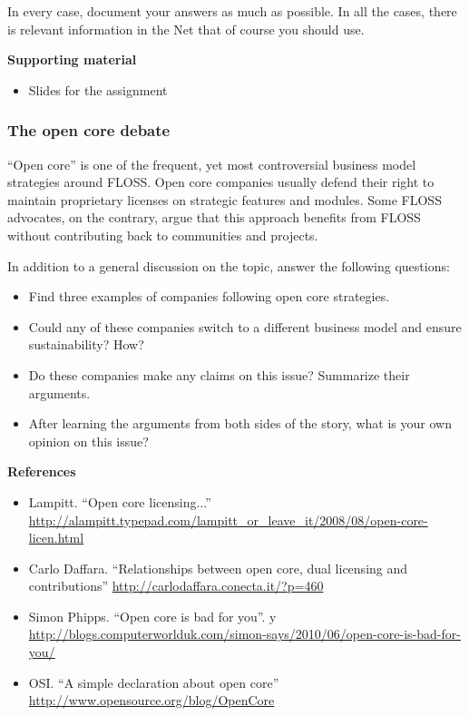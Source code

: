 \documentclass[a4paper]{article}
\begin{document}
In every case, document your answers as much as possible. In all the cases, there is relevant information in the Net that of course you should use.

\textbf{Supporting material}

\begin{itemize}
\item Slides for the assignment
\end{itemize}

\subsubsection{The open core debate}
\label{sub:business-opencore}

``Open core'' is one of the frequent, yet most controversial business model strategies around FLOSS. Open core companies usually defend their right to maintain proprietary licenses on strategic features and modules. Some FLOSS advocates, on the contrary, argue that this approach benefits from FLOSS without contributing back to communities and projects.

In addition to a general discussion on the topic, answer the following questions:

\begin{itemize}
\item Find three examples of companies following open core strategies.
\item Could any of these companies switch to a different business model
  and ensure sustainability? How?
\item Do these companies make any claims on this issue? Summarize
  their arguments.
\item After learning the arguments from both sides of the story, what is your
  own opinion on this issue?
\end{itemize}

\textbf{References}

\begin{itemize}
\item Lampitt. ``Open core licensing...''
  \footnotesize{\url{http://alampitt.typepad.com/lampitt_or_leave_it/2008/08/open-core-licen.html}}
\item Carlo Daffara. ``Relationships between open core, dual licensing and contributions''
   \url{http://carlodaffara.conecta.it/?p=460}
 \item Simon Phipps. ``Open core is bad for you''.
y   \footnotesize{\url{http://blogs.computerworlduk.com/simon-says/2010/06/open-core-is-bad-for-you/}}
 \item OSI. ``A simple declaration about open core''
   \url{http://www.opensource.org/blog/OpenCore}
\end{itemize}
\end{document}
